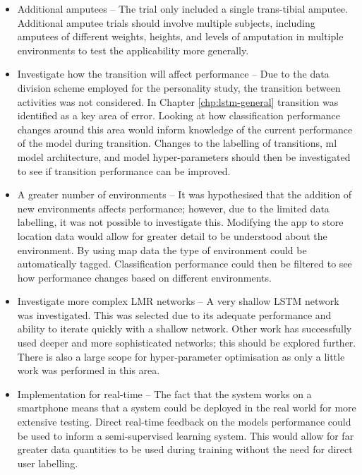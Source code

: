 \begin{itemize}
    \item Additional amputees --  The trial only included a single trans-tibial amputee. Additional amputee trials should involve multiple subjects, including amputees of different weights, heights, and levels of amputation in multiple environments to test the applicability more generally.
    
    \item Investigate how the transition will affect performance -- Due to the data division scheme employed for the personality study, the transition between activities was not considered. In Chapter \ref{chp:lstm-general} transition was identified as a key area of error. Looking at how classification performance changes around this area would inform knowledge of the current performance of the model during transition. Changes to the labelling of transitions, \acrshort{ml} model architecture, and model hyper-parameters should then be investigated to see if transition performance can be improved.
    
    \item A greater number of environments -- It was hypothesised that the addition of new environments affects performance; however, due to the limited data labelling, it was not possible to investigate this. Modifying the app to store location data would allow for greater detail to be understood about the environment. By using map data the type of environment could be automatically tagged. Classification performance could then be filtered to see how performance changes based on different environments.
    
    \item Investigate more complex LMR networks -- A very shallow LSTM network was investigated. This was selected due to its adequate performance and ability to iterate quickly with a shallow network. Other work has successfully used deeper and more sophisticated networks; this should be explored further. There is also a large scope for hyper-parameter optimisation as only a little work was performed in this area.
    
    \item Implementation for real-time -- The fact that the system works on a smartphone means that a system could be deployed in the real world for more extensive testing. Direct real-time feedback on the models performance could be used to inform a semi-supervised learning system. This would allow for far greater data quantities to be used during training without the need for direct user labelling.
\end{itemize}


